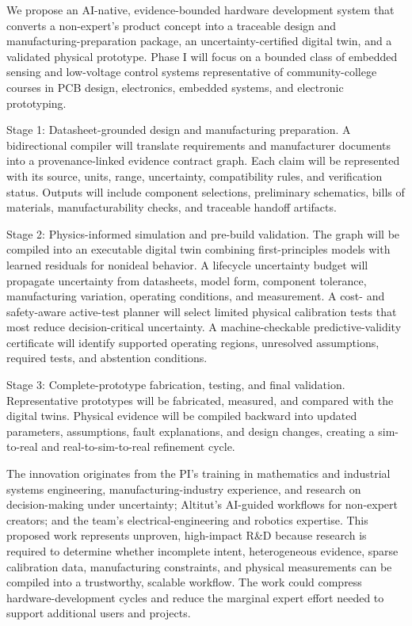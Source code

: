 We propose an AI-native, evidence-bounded hardware development system that converts a non-expert's product concept into a traceable design and manufacturing-preparation package, an uncertainty-certified digital twin, and a validated physical prototype. 
Phase I will focus on a bounded class of embedded sensing and low-voltage control systems representative of community-college courses in PCB design, electronics, embedded systems, and electronic prototyping.

Stage 1: Datasheet-grounded design and manufacturing preparation.
A bidirectional compiler will translate requirements and manufacturer documents into a provenance-linked evidence contract graph. 
Each claim will be represented with its source, units, range, uncertainty, compatibility rules, and verification status. 
Outputs will include component selections, preliminary schematics, bills of materials, manufacturability checks, and traceable handoff artifacts.

Stage 2: Physics-informed simulation and pre-build validation.
The graph will be compiled into an executable digital twin combining first-principles models with learned residuals for nonideal behavior. 
A lifecycle uncertainty budget will propagate uncertainty from datasheets, model form, component tolerance, manufacturing variation, operating conditions, and measurement. 
A cost- and safety-aware active-test planner will select limited physical calibration tests that most reduce decision-critical uncertainty. 
A machine-checkable predictive-validity certificate will identify supported operating regions, unresolved assumptions, required tests, and abstention conditions.

Stage 3: Complete-prototype fabrication, testing, and final validation.
Representative prototypes will be fabricated, measured, and compared with the digital twins. 
Physical evidence will be compiled backward into updated parameters, assumptions, fault explanations, and design changes, creating a sim-to-real and real-to-sim-to-real refinement cycle.

The innovation originates from the PI's training in mathematics and industrial systems engineering, manufacturing-industry experience, and research on decision-making under uncertainty; Altitut's AI-guided workflows for non-expert creators; and the team's electrical-engineering and robotics expertise. 
This proposed work represents unproven, high-impact R\&D because research is required to determine whether incomplete intent, heterogeneous evidence, sparse calibration data, manufacturing constraints, and physical measurements can be compiled into a trustworthy, scalable workflow. 
The work could compress hardware-development cycles and reduce the marginal expert effort needed to support additional users and projects.

